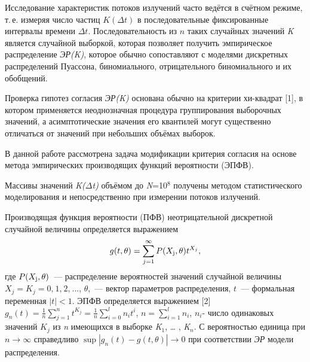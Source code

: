 






\vzmscaption

Исследование характеристик потоков излучений часто ведётся в счётном режиме,
т.\,е. измеряя число частиц $K(\Delta t)$  в последовательные фиксированные интервалы времени $\Delta t$.
Последовательность из $n$ таких случайных значений \textit{K} является случайной выборкой, которая позволяет получить эмпирическое распределение \textit{ЭР(K)}, которое обычно сопоставляют с моделями дискретных распределений Пуассона, биномиального, отрицательного биномиального и их обобщений.

Проверка гипотез согласия \textit{ЭР(K)} основана обычно на критерии хи-квадрат [1], в котором применяется неоднозначная процедура группирования выборочных значений, а асимптотические значения его квантилей могут существенно отличаться от значений при небольших объёмах выборок.

В данной работе рассмотрена задача модификации критерия согласия на основе метода эмпирических производящих функций вероятности (ЭПФВ).

Массивы значений \textit{K($\Delta$t)} объёмом до \textit{N}=10${}^{8}$ получены методом статистического моделирования и непосредственно при измерении потоков излучений.

Производящая функция вероятности (ПФВ) неотрицательной дискретной случайной величины определяется выражением
\[g(t,\theta )=\sum _{j=1}^{\infty }P(X_{{\rm j}} ,\theta )t^{X_{j} }  ,\]
где $P(X_{{\rm j}} ,\theta )$~--- распределение вероятностей значений случайной величины
$X_{j} =K_{j} =0,_{} 1,_{} 2,_{} ...$, $\theta $,~--- вектор параметров распределения,
$t$~--- формальная переменная $\left|t\right|<1$.
ЭПФВ определяется выражением [2]
$g_{n} (t)=\frac{1}{n} \sum _{j=1}^{n}t^{K_{j} }  =\frac{1}{n} \sum _{i=0}^{l}n_{i} t^{i}  $, $n=\sum _{i=1}^{l}n_{i}  $,  $n_{i} $- число одинаковых значений $K_{j} $ из \textit{n} имеющихся в выборке \textit{K}${}_{1}$,  {\dots} , \textit{K${}_{n}$}. С вероятностью единица при $n\to \infty $ справедливо $\sup \left|g_{n} (t)-g(t,\theta )\right|\to 0$ при соответствии \textit{ЭР} модели распределения.

